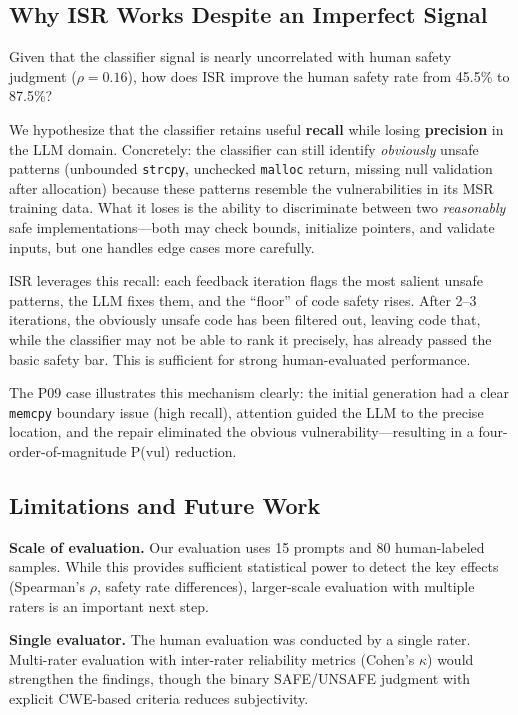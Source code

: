 \documentclass[10pt,conference]{IEEEtran}
\begin{document}
\subsection{Why ISR Works Despite an Imperfect Signal}

Given that the classifier signal is nearly uncorrelated with human safety judgment ($\rho=0.16$), how does ISR improve the human safety rate from 45.5\% to 87.5\%?

We hypothesize that the classifier retains useful \textbf{recall} while losing \textbf{precision} in the LLM domain. Concretely: the classifier can still identify \textit{obviously} unsafe patterns (unbounded \texttt{strcpy}, unchecked \texttt{malloc} return, missing null validation after allocation) because these patterns resemble the vulnerabilities in its MSR training data. What it loses is the ability to discriminate between two \textit{reasonably} safe implementations---both may check bounds, initialize pointers, and validate inputs, but one handles edge cases more carefully.

ISR leverages this recall: each feedback iteration flags the most salient unsafe patterns, the LLM fixes them, and the ``floor'' of code safety rises. After 2--3 iterations, the obviously unsafe code has been filtered out, leaving code that, while the classifier may not be able to rank it precisely, has already passed the basic safety bar. This is sufficient for strong human-evaluated performance.

The P09 case illustrates this mechanism clearly: the initial generation had a clear \texttt{memcpy} boundary issue (high recall), attention guided the LLM to the precise location, and the repair eliminated the obvious vulnerability---resulting in a four-order-of-magnitude P(vul) reduction.

\subsection{Limitations and Future Work}

\textbf{Scale of evaluation.} Our evaluation uses 15 prompts and 80 human-labeled samples. While this provides sufficient statistical power to detect the key effects (Spearman's $\rho$, safety rate differences), larger-scale evaluation with multiple raters is an important next step.

\textbf{Single evaluator.} The human evaluation was conducted by a single rater. Multi-rater evaluation with inter-rater reliability metrics (Cohen's $\kappa$) would strengthen the findings, though the binary SAFE/UNSAFE judgment with explicit CWE-based criteria reduces subjectivity.
\end{document}

